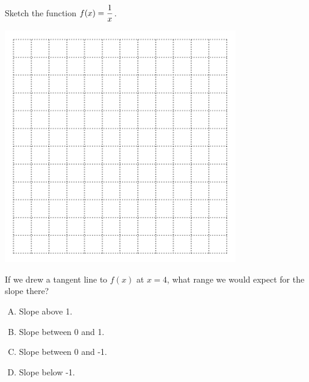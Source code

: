 

\begin{problem}
Sketch the function $\displaystyle f(x)=\frac{1}{x}$.
\end{problem}

\includegraphics[width=4in]{graphics/empty_graph_square_12}

\newpage

\begin{problem}
If we drew a tangent line to $f(x)$ at $x=4$, what range we would expect for the slope there?

\begin{enumerate}[A.]
\item Slope above 1. \\[2ex]
\item Slope between 0 and 1.  \\[2ex]
\item Slope between 0 and -1.\\[2ex] 
\item Slope below -1.
\end{enumerate}
\end{problem}



